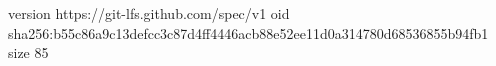 version https://git-lfs.github.com/spec/v1
oid sha256:b55c86a9c13defcc3c87d4ff4446acb88e52ee11d0a314780d68536855b94fb1
size 85
